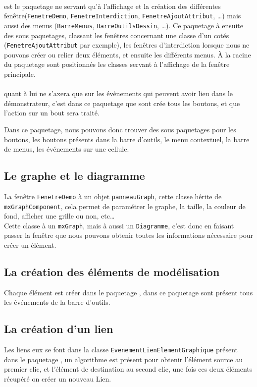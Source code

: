 \documentclass[12pt,a4paper,oneside]{book}
\begin{document}
	\paragraph{}	

	 est le paquetage ne servant qu'à l'affichage et la création des différentes fenêtre(\texttt{FenetreDemo}, \texttt{FenetreInterdiction}, \texttt{FenetreAjoutAttribut}, \ldots) mais aussi des menus (\texttt{BarreMenus}, \texttt{BarreOutilsDessin}, \ldots).
	Ce paquetage à ensuite des sous paquetages, classant les fenêtres concernant une classe d'un cotés (\texttt{FenetreAjoutAttribut} par exemple), les fenêtres d'interdiction
	lorsque nous ne pouvons créer ou relier deux éléments, et ensuite les différents menus. À la racine du paquetage  sont positionnés 
	les classes servant à l'affichage de la fenêtre principale.
	\paragraph{}
	 quant à lui ne s'axera que sur les évènements qui peuvent avoir lieu dans le démonstrateur, c'est dans ce paquetage que sont crée
	tous les boutons, et que l'action sur un bout sera traité.

	Dans ce paquetage, nous pouvons donc trouver des sous paquetages pour les boutons, les boutons présents dans la barre d'outils, le menu contextuel, la barre de menus, les
	événements sur une cellule.

	\subsection{Le graphe et le diagramme}
	La fenêtre \texttt{FenetreDemo} à un objet \texttt{panneauGraph}, cette classe hérite de \texttt{mxGraphComponent}, cela permet de paramétrer le graphe, la taille, la couleur de fond, afficher une grille ou non, etc\ldots \\
	Cette classe à un \texttt{mxGraph}, mais à aussi un \texttt{Diagramme}, c'est donc en faisant passer la fenêtre que nous pouvons obtenir toutes les informations
	nécessaire pour créer un élément. 
	\subsection{La création des éléments de modélisation}
	Chaque élément est créer dans le paquetage , dans ce paquetage sont présent tous les événements de la barre d'outils. 
	\subsection{La création d'un lien}
	Les liens eux se font dans la classe \texttt{EvenementLienElementGraphique} présent dans le paquetage , un algorithme
	est présent pour obtenir l'élément source au premier clic, et l'élément de destination au second clic, une fois ces deux éléments récupéré on créer
	un nouveau Lien.
\end{document}

